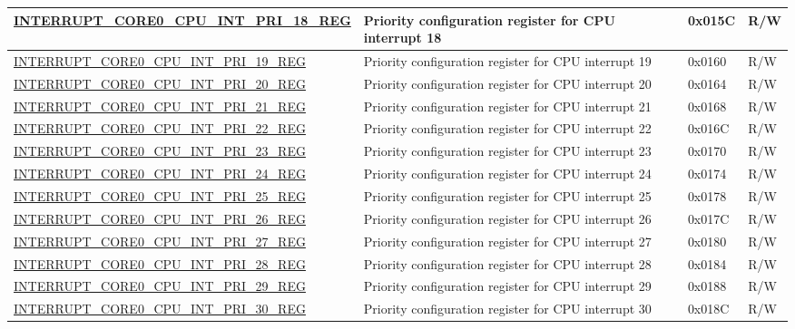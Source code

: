 \begin{longtable}{ | p{10cm} | m{9cm} | m{1.3cm} | m{1.0cm} | }
\hyperref[regdesc:INTERRUPTCORE0CPUINTPRI0REG]{INTERRUPT\_CORE0\_CPU\_INT\_PRI\_18\_REG} & Priority configuration register for CPU interrupt 18 & 0x015C & R/W \\ \hline
\hyperref[regdesc:INTERRUPTCORE0CPUINTPRI0REG]{INTERRUPT\_CORE0\_CPU\_INT\_PRI\_19\_REG} & Priority configuration register for CPU interrupt 19 & 0x0160 & R/W \\ \hline
\hyperref[regdesc:INTERRUPTCORE0CPUINTPRI0REG]{INTERRUPT\_CORE0\_CPU\_INT\_PRI\_20\_REG} & Priority configuration register for CPU interrupt 20 & 0x0164 & R/W \\ \hline
\hyperref[regdesc:INTERRUPTCORE0CPUINTPRI0REG]{INTERRUPT\_CORE0\_CPU\_INT\_PRI\_21\_REG} & Priority configuration register for CPU interrupt 21 & 0x0168 & R/W \\ \hline
\hyperref[regdesc:INTERRUPTCORE0CPUINTPRI0REG]{INTERRUPT\_CORE0\_CPU\_INT\_PRI\_22\_REG} & Priority configuration register for CPU interrupt 22 & 0x016C & R/W \\ \hline
\hyperref[regdesc:INTERRUPTCORE0CPUINTPRI0REG]{INTERRUPT\_CORE0\_CPU\_INT\_PRI\_23\_REG} & Priority configuration register for CPU interrupt 23 & 0x0170 & R/W \\ \hline
\hyperref[regdesc:INTERRUPTCORE0CPUINTPRI0REG]{INTERRUPT\_CORE0\_CPU\_INT\_PRI\_24\_REG} & Priority configuration register for CPU interrupt 24 & 0x0174 & R/W \\ \hline
\hyperref[regdesc:INTERRUPTCORE0CPUINTPRI0REG]{INTERRUPT\_CORE0\_CPU\_INT\_PRI\_25\_REG} & Priority configuration register for CPU interrupt 25 & 0x0178 & R/W \\ \hline
\hyperref[regdesc:INTERRUPTCORE0CPUINTPRI0REG]{INTERRUPT\_CORE0\_CPU\_INT\_PRI\_26\_REG} & Priority configuration register for CPU interrupt 26 & 0x017C & R/W \\ \hline
\hyperref[regdesc:INTERRUPTCORE0CPUINTPRI0REG]{INTERRUPT\_CORE0\_CPU\_INT\_PRI\_27\_REG} & Priority configuration register for CPU interrupt 27 & 0x0180 & R/W \\ \hline
\hyperref[regdesc:INTERRUPTCORE0CPUINTPRI0REG]{INTERRUPT\_CORE0\_CPU\_INT\_PRI\_28\_REG} & Priority configuration register for CPU interrupt 28 & 0x0184 & R/W \\ \hline
\hyperref[regdesc:INTERRUPTCORE0CPUINTPRI0REG]{INTERRUPT\_CORE0\_CPU\_INT\_PRI\_29\_REG} & Priority configuration register for CPU interrupt 29 & 0x0188 & R/W \\ \hline
\hyperref[regdesc:INTERRUPTCORE0CPUINTPRI0REG]{INTERRUPT\_CORE0\_CPU\_INT\_PRI\_30\_REG} & Priority configuration register for CPU interrupt 30 & 0x018C & R/W \\ \hline

\end{longtable}
